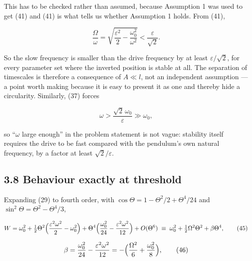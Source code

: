 \documentclass[11pt,a4paper]{article}
\newcommand{\tagmark}[1]{\marginnote{\scriptsize\ttfamily #1}}
\newcommand{\Dtag}{\tagmark{[D]}}   %
\begin{document}
This has to be checked rather than assumed, because Assumption 1 was used to get
(41) and (41) is what tells us whether Assumption 1 holds. From (41),

\begin{equation}
\frac{\Omega}{\omega}
 = \sqrt{\frac{\varepsilon^2}{2}-\frac{\omega_0^2}{\omega^2}}
 < \frac{\varepsilon}{\sqrt2}. \tag{43}
\end{equation}

\Dtag{} So the slow frequency is smaller than the drive frequency by at least
\(\varepsilon/\sqrt2\), for every parameter set where the inverted position is
stable at all. The separation of timescales is therefore a consequence of
\(A\ll l\), not an independent assumption --- a point worth making because it is
easy to present it as one and thereby hide a circularity. Similarly, (37) forces

\begin{equation}
\omega > \frac{\sqrt2\,\omega_0}{\varepsilon} \gg \omega_0, \tag{44}
\end{equation}

so ``\(\omega\) large enough'' in the problem statement is not vague: stability
itself requires the drive to be fast compared with the pendulum's own natural
frequency, by a factor at least \(\sqrt2/\varepsilon\).

\hypertarget{behaviour-exactly-at-threshold}{%
\subsection{3.8 Behaviour exactly at threshold}\label{behaviour-exactly-at-threshold}}

Expanding (29) to fourth order, with \(\cos\Theta=1-\Theta^2/2+\Theta^4/24\) and
\(\sin^2\Theta=\Theta^2-\Theta^4/3\),

\begin{equation}
W = \omega_0^2
 + \tfrac12\Theta^2\Bigl(\frac{\varepsilon^2\omega^2}{2}-\omega_0^2\Bigr)
 + \Theta^4\Bigl(\frac{\omega_0^2}{24}-\frac{\varepsilon^2\omega^2}{12}\Bigr)
 + O(\Theta^6)
 \;\equiv\; \omega_0^2 + \tfrac12\Omega^2\Theta^2 + \beta\Theta^4, \tag{45}
\end{equation}

\begin{equation}
\beta = \frac{\omega_0^2}{24}-\frac{\varepsilon^2\omega^2}{12}
       = -\Bigl(\frac{\Omega^2}{6}+\frac{\omega_0^2}{8}\Bigr), \tag{46}
\end{equation}
\end{document}
